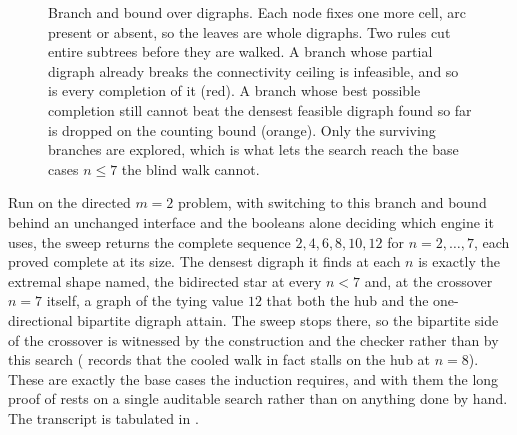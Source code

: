 \begin{figure}[ht]
\centering
{}
\caption{Branch and bound over digraphs. Each node fixes one more cell, arc present or absent, so the leaves are whole digraphs. Two rules cut entire subtrees before they are walked. A branch whose partial digraph already breaks the connectivity ceiling is infeasible, and so is every completion of it (red). A branch whose best possible completion still cannot beat the densest feasible digraph found so far is dropped on the counting bound (orange). Only the surviving branches are explored, which is what lets the search reach the base cases $n \le 7$ the blind walk cannot.}
\label{fig:prune}
\end{figure}

Run on the directed $m = 2$ problem, with  switching to this branch and bound behind an unchanged interface and the booleans alone deciding which engine it uses, the sweep returns the complete sequence $2, 4, 6, 8, 10, 12$ for $n = 2, \dots, 7$, each proved complete at its size. The densest digraph it finds at each $n$ is exactly the extremal shape  named, the bidirected star at every $n < 7$ and, at the crossover $n = 7$ itself, a graph of the tying value $12$ that both the hub and the one-directional bipartite digraph attain. The sweep stops there, so the bipartite side of the crossover is witnessed by the construction and the checker rather than by this search ( records that the cooled walk in fact stalls on the hub at $n = 8$). These are exactly the base cases the induction requires, and with them the long proof of  rests on a single auditable search rather than on anything done by hand. The transcript is tabulated in .

